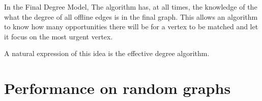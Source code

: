 \label{section:degree}
\begin{definition}
	In the Final Degree Model, The algorithm has, at all times, the knowledge of the what the degree of all offline edges is in the final graph. This allows an algorithm to know how many opportunities there will be for a vertex to be matched and let it focus on the most urgent vertex. 
\end{definition}

A natural expression of this idea is the effective degree algorithm.



\section{Performance on random graphs}


